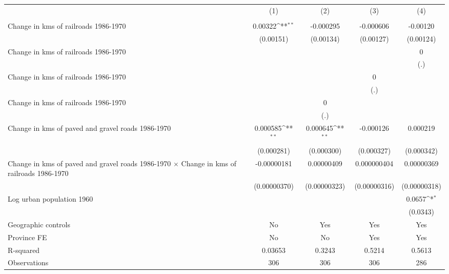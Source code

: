 {
\def\sym#1{\ifmmode^{#1}\else\(^{#1}\)\fi}
\begin{tabular}{l*{4}{c}}
\hline\hline
                &\multicolumn{1}{c}{(1)}&\multicolumn{1}{c}{(2)}&\multicolumn{1}{c}{(3)}&\multicolumn{1}{c}{(4)}\\
                &\multicolumn{1}{c}{}&\multicolumn{1}{c}{}&\multicolumn{1}{c}{}&\multicolumn{1}{c}{}\\
\hline
Change in kms of railroads 1986-1970&  0.00322\sym{**} &-0.000295         &-0.000606         & -0.00120         \\
                &(0.00151)         &(0.00134)         &(0.00127)         &(0.00124)         \\
[1em]
Change in kms of railroads 1986-1970&                  &                  &                  &        0         \\
                &                  &                  &                  &      (.)         \\
[1em]
Change in kms of railroads 1986-1970&                  &                  &        0         &                  \\
                &                  &                  &      (.)         &                  \\
[1em]
Change in kms of railroads 1986-1970&                  &        0         &                  &                  \\
                &                  &      (.)         &                  &                  \\
[1em]
Change in kms of paved and gravel roads 1986-1970& 0.000585\sym{**} & 0.000645\sym{**} &-0.000126         & 0.000219         \\
                &(0.000281)         &(0.000300)         &(0.000327)         &(0.000342)         \\
[1em]
Change in kms of paved and gravel roads 1986-1970 $\times$ Change in kms of railroads 1986-1970&-0.00000181         &0.00000409         &0.000000404         &0.00000369         \\
                &(0.00000370)         &(0.00000323)         &(0.00000316)         &(0.00000318)         \\
[1em]
Log urban population 1960&                  &                  &                  &   0.0657\sym{*}  \\
                &                  &                  &                  & (0.0343)         \\
\hline
Geographic controls&       No         &      Yes         &      Yes         &      Yes         \\
Province FE     &       No         &       No         &      Yes         &      Yes         \\
R-squared       &  0.03653         &   0.3243         &   0.5214         &   0.5613         \\
Observations    &      306         &      306         &      306         &      286         \\
\hline\hline
\end{tabular}
}

